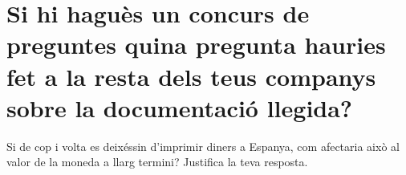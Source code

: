 \section {
  Si hi haguès un concurs de preguntes quina pregunta hauries fet a la
  resta dels teus companys sobre la documentació llegida?
}

Si de cop i volta es deixéssin d'imprimir diners a Espanya, com afectaria
això al valor de la moneda a llarg termini? Justifica la teva resposta.
